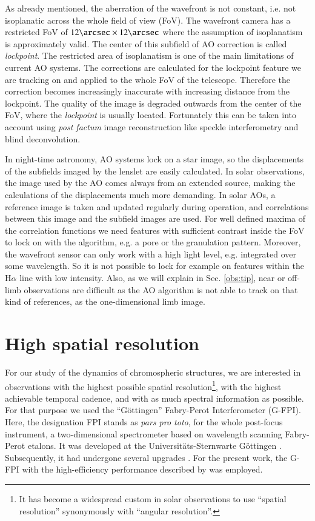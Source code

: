 As already mentioned, the aberration of the wavefront is not constant, i.e. not isoplanatic across the whole field of view (FoV). The wavefront camera has a restricted FoV of $12\arcsec \times 12\arcsec$ where the assumption of isoplanatism is approximately valid. The center of this subfield of AO correction is called \emph{lockpoint}. The restricted area of isoplanatism is one of the main limitations of current AO systems. The corrections are calculated for the lockpoint feature we are tracking on and applied to the whole FoV of the telescope. Therefore the correction becomes increasingly inaccurate with increasing distance from the lockpoint. The quality of the image is degraded outwards from the center of the FoV, where the \emph{lockpoint} is usually located.  Fortunately this can be taken into account using {\em post factum} image reconstruction like speckle interferometry and blind deconvolution.

In night-time astronomy, AO systems lock on a star image, so the displacements of the subfields imaged by the lenslet are easily calculated. In solar observations, the image used by the AO comes always from an extended source, making the calculations of the displacements much more demanding. In solar AOs, a reference image is taken and updated regularly during operation, and correlations between this image and the subfield images are used. For well defined maxima of the correlation functions we need features with sufficient contrast inside the FoV to lock on with the algorithm, e.g. a pore or the granulation pattern. Moreover, the wavefront sensor can only work with a high light level, e.g. integrated over some wavelength. So it is not possible to lock for example on  features within the H$\alpha$ line with low intensity. Also, as we will explain in Sec. \ref{obs:tip}, near or off-limb observations are difficult as the AO algorithm is not able to track on that kind of references, as the one-dimensional limb image.




\section{High spatial resolution}
For our study of the dynamics of chromospheric structures, we are interested in observations with the highest possible spatial resolution\footnote{It has become a widespread custom in solar observations  to use  ``spatial resolution'' synonymously  with ``angular resolution''.}, with the highest achievable temporal cadence, and with as much spectral information as possible. For that purpose we used the ``G\"ottingen'' Fabry-Perot Interferometer (G-FPI). Here, the designation FPI stands as \emph{pars pro toto}, for the whole post-focus instrument, a two-dimensional spectrometer based on wavelength scanning Fabry-Perot etalons. It was developed at the Universit\"ats-Sternwarte G\"ottingen \citep{1992A&A...257..817B,1993PhDT.......243B,1995A&AS..112..371B}. Subsequently, it had undergone several upgrades \citep{2001A&A...365..588K, 2006A&A...451.1151P,Gonzalez:2007fk}. For the present work, the G-FPI with the high-efficiency performance described by \cite{2006A&A...451.1151P} was employed.

